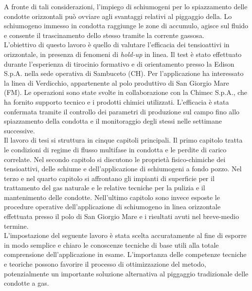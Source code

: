 A fronte di tali considerazioni, l'impiego di schiumogeni per lo spiazzamento delle condotte orizzontali può ovviare agli svantaggi relativi al piggaggio della. Lo schiumogeno immesso in condotta raggiunge le zone di accumulo, agisce sul fluido e consente il trascinamento dello stesso tramite la corrente gassosa.\\
L'obiettivo di questo lavoro è quello di valutare l'efficacia dei tensioattivi in orizzontale, in presenza di fenomeni di \textit{hold-up} in linea. Il test è stato effettuato durante l'esperienza di tirocinio formativo e di orientamento presso la Edison S.p.A. nella sede operativa di Sambuceto (CH). Per l'applicazione ha interessato la linea di Verdicchio, appartenente al polo produttivo di San Giorgio Mare (FM). Le operazioni sono state svolte in collaborazione con la Chimec S.p.A., che ha fornito supporto tecnico e i prodotti chimici utilizzati. L'efficacia è stata confermata tramite il controllo dei parametri di produzione sul campo fino allo spiazzamento della condotta e il monitoraggio degli stessi nelle settimane successive.\\
Il lavoro di tesi si struttura in cinque capitoli principali. Il primo capitolo tratta le condizioni di regime di flusso multifase in condotta e le perdite di carico correlate. Nel secondo capitolo si discutono le proprietà fisico-chimiche dei tensioattivi, delle schiume e dell'applicazione di schiumogeni a fondo pozzo. Nel terzo e nel quarto capitolo si affrontano gli impianti di superficie per il trattamento del gas naturale e le relative tecniche per la pulizia e il mantenimento delle condotte. Nell'ultimo capitolo sono invece esposte le procedure operative dell'applicazione di schiumogeno in linea orizzontale effettuata presso il polo di San Giorgio Mare e i risultati avuti nel breve-medio termine.\\
L'impostazione del seguente lavoro è stata scelta accuratamente al fine di esporre in modo semplice e chiaro le conoscenze tecniche di base utili alla totale comprensione dell'applicazione in esame. L'importanza delle competenze tecniche e teoriche possono favorire il processo di ottimizzazione del metodo, potenzialmente un importante soluzione alternativa al piggaggio tradizionale delle condotte a gas.
\clearpage{\pagestyle{empty}\cleardoublepage}

